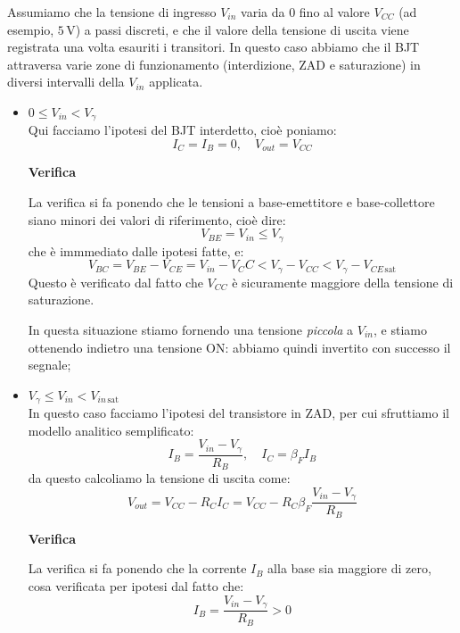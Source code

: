 \documentclass[a4paper,11pt]{article}
\begin{document}
Assumiamo che la tensione di ingresso $V_{in}$ varia da 0 fino al valore $V_{CC}$ (ad esempio, $5 \, \mathrm{V}$) a passi discreti, e che il valore della tensione di uscita viene registrata una volta esauriti i transitori. In questo caso abbiamo che il  BJT attraversa varie zone di funzionamento (interdizione, ZAD e saturazione) in diversi intervalli della $V_{in}$ applicata.

\begin{itemize}
	\item $0 \leq V_{in} < V_\gamma$ \\
Qui facciamo l'ipotesi del BJT interdetto, cioè poniamo:
$$
I_C = I_B = 0, \quad V_{out} = V_{CC}
$$

\par\smallskip

\newpage

\noindent
\textbf{\textsf{Verifica}}

\noindent
La verifica si fa ponendo che le tensioni a base-emettitore e base-collettore siano minori dei valori di riferimento, cioè dire:
$$
V_{BE} = V_{in} \leq V_\gamma
$$
che è immmediato dalle ipotesi fatte, e:
$$
V_{BC} = V_{BE} - V_{CE} = V_{in} - {V_CC} < V_\gamma - V_{CC} < V_\gamma - V_{CE \, \mathrm{sat}}
$$
Questo è verificato dal fatto che $V_{CC}$ è sicuramente maggiore della tensione di saturazione.

\par\smallskip

In questa situazione stiamo fornendo una tensione \textit{piccola} a $V_{in}$, e stiamo ottenendo indietro una tensione ON: abbiamo quindi invertito con successo il segnale;

	\item $V_\gamma \leq V_{in} < V_{in \, \mathrm{sat}}$ \\
In questo caso facciamo l'ipotesi del transistore in ZAD, per cui sfruttiamo il modello analitico semplificato:
$$
I_B = \frac{V_{in} - V_\gamma}{R_B}, \quad I_C = \beta_F I_B
$$
da questo calcoliamo la tensione di uscita come:
$$
V_{out} = V_{CC} - R_C I_C = V_{CC} - R_C \beta_F \frac{V_{in} - V_\gamma}{R_B}
$$

\par\smallskip

\noindent
\textbf{\textsf{Verifica}}

\noindent
La verifica si fa ponendo che la corrente $I_B$ alla base sia maggiore di zero, cosa verificata per ipotesi dal fatto che:
$$
I_B = \frac{V_{in} - V_\gamma}{R_B} > 0
$$


\end{itemize}
\end{document}
